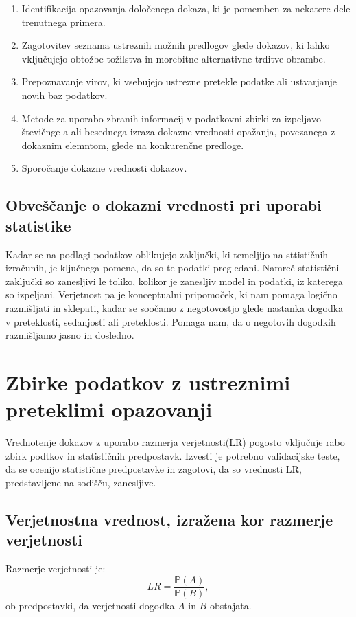 \documentclass[a4paper,12pt]{article}
\begin{document}
\begin{enumerate}
   \item Identifikacija opazovanja določenega dokaza, ki je pomemben za nekatere dele trenutnega primera.
   \item Zagotovitev seznama ustreznih možnih predlogov glede dokazov, ki lahko vključujejo obtožbe tožilstva in morebitne 
         alternativne trditve obrambe.
   \item Prepoznavanje virov, ki vsebujejo ustrezne pretekle podatke ali ustvarjanje novih baz podatkov.
   \item Metode za uporabo zbranih informacij v podatkovni zbirki za izpeljavo števičnge a ali besednega izraza dokazne 
         vrednosti opažanja, povezanega z dokaznim elemntom, glede na konkurenčne predloge.
   \item Sporočanje dokazne vrednosti dokazov.
\end{enumerate}

\subsection{Obveščanje o dokazni vrednosti pri uporabi statistike}
Kadar se na podlagi podatkov oblikujejo zaključki, ki temeljijo na sttističnih izračunih, je ključnega pomena, da so te podatki 
pregledani. Namreč statistični zaključki so zanesljivi le toliko, kolikor je zanesljiv model in podatki, iz katerega so 
izpeljani. Verjetnost pa je konceptualni pripomoček, ki nam pomaga logično razmišljati in sklepati, kadar se soočamo z negotovostjo 
glede nastanka dogodka v preteklosti, sedanjosti ali preteklosti. Pomaga nam, da o negotovih dogodkih razmišljamo jasno in dosledno.

\section{Zbirke podatkov z ustreznimi preteklimi opazovanji}
Vrednotenje dokazov z uporabo razmerja verjetnosti(LR) pogosto vključuje rabo zbirk podtkov in statističnih predpostavk. Izvesti je 
potrebno validacijske teste, da se ocenijo statistične predpostavke in zagotovi, da so vrednosti LR, predstavljene na sodišču, 
zanesljive.

\subsection{Verjetnostna vrednost, izražena kor razmerje verjetnosti}
Razmerje verjetnosti je:
\[ LR = \frac{\mathbb{P}(A)}{\mathbb{P}(B)},\]
ob predpostavki, da verjetnosti dogodka $A$ in $B$ obstajata. \\ \\
\end{document}
